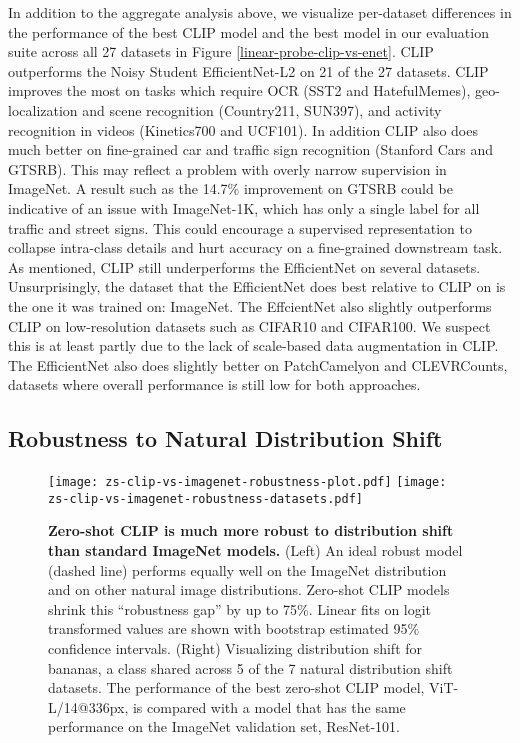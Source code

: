 \documentclass{article}
\begin{document}
In addition to the aggregate analysis above, we visualize per-dataset differences in the performance of the best CLIP model and the best model in our evaluation suite across all 27 datasets in Figure \ref{linear-probe-clip-vs-enet}. CLIP outperforms the Noisy Student EfficientNet-L2 on 21 of the 27 datasets. CLIP improves the most on tasks which require OCR (SST2 and HatefulMemes), geo-localization and scene recognition (Country211, SUN397), and activity recognition in videos (Kinetics700 and UCF101). In addition CLIP also does much better on fine-grained car and traffic sign recognition (Stanford Cars and GTSRB). This may reflect a problem with overly narrow supervision in ImageNet. A result such as the 14.7\% improvement on GTSRB could be indicative of an issue with ImageNet-1K, which has only a single label for all traffic and street signs. This could encourage a supervised representation to collapse intra-class details and hurt accuracy on a fine-grained downstream task. As mentioned, CLIP still underperforms the EfficientNet on several datasets. Unsurprisingly, the dataset that the EfficientNet does best relative to CLIP on is the one it was trained on: ImageNet. The EffcientNet also slightly outperforms CLIP on low-resolution datasets such as CIFAR10 and CIFAR100. We suspect this is at least partly due to the lack of scale-based data augmentation in CLIP. The EfficientNet also does slightly better on PatchCamelyon and CLEVRCounts, datasets where overall performance is still low for both approaches.








\subsection{Robustness to Natural Distribution Shift}
\label{subsection:robustness}



\begin{figure*}[t]
\begin{center}
\texttt{[image: zs-clip-vs-imagenet-robustness-plot.pdf]}
\texttt{[image: zs-clip-vs-imagenet-robustness-datasets.pdf]}
\caption{\textbf{Zero-shot CLIP is much more robust to distribution shift than standard ImageNet models.} (Left) An ideal robust model (dashed line) performs equally well on the ImageNet distribution and on other natural image distributions. Zero-shot CLIP models shrink this ``robustness gap'' by up to 75\%. Linear fits on logit transformed values are shown with bootstrap estimated 95\% confidence intervals. (Right) Visualizing distribution shift for bananas, a class shared across 5 of the 7 natural distribution shift datasets. The performance of the best zero-shot CLIP model, ViT-L/14@336px, is compared with a model that has the same performance on the ImageNet validation set, ResNet-101.}
\label{robust_main_fig}
\end{center}
\end{figure*}
\end{document}
